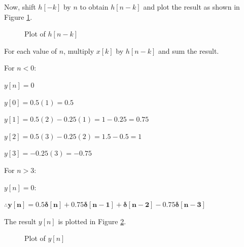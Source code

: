 \documentclass[fleqn]{article}
\begin{document}
\begin{enumerate}[nolistsep]
		Now, shift $h[-k]$ by $n$ to obtain $h[n-k]$ and plot the result as shown in Figure \ref{prob1_hn-k_plot}.
		
		\begin{figure}[H]				
			\centerline{}
			\caption{Plot of $h[n-k]$}
			\label{prob1_hn-k_plot}
		\end{figure}
		
		For each value of $n$, multiply $x[k]$ by $h[n-k]$ and sum the result.
		
		For $n < 0$:
		
		$y[n] = 0$
		
		$y[0] = 0.5(1) = 0.5$
		
		$y[1] = 0.5(2) - 0.25(1) = 1 - 0.25 = 0.75$
		
		$y[2] = 0.5(3) - 0.25(2) = 1.5 - 0.5 = 1$
		
		$y[3] = -0.25(3) = -0.75$
		
		For $n > 3$:
		
		$y[n] = 0$:
		
		$\mathbf{\therefore y[n] = 0.5\delta[n] + 0.75\delta[n-1] + \delta[n-2] - 0.75\delta[n-3]}$
		
		The result $y[n]$ is plotted in Figure \ref{prob1_yn_plot}.
		
		\begin{figure}[H]				
			\centerline{}
			\caption{Plot of $y[n]$}
			\label{prob1_yn_plot}
		\end{figure}
		

\end{enumerate}
\end{document}
